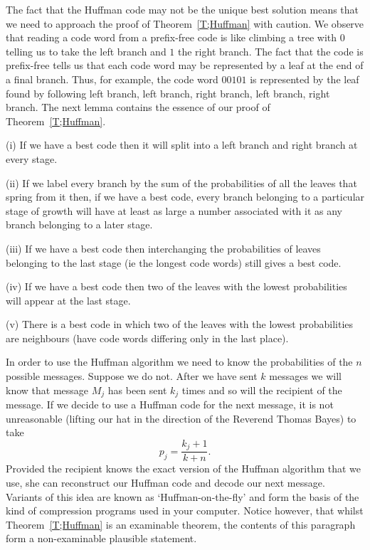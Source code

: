 The fact that the Huffman code may not be the unique
best solution means that we need to approach the proof of 
Theorem~\ref{T;Huffman} with caution. We observe that
reading a code word from a prefix-free
code is like climbing a tree
with $0$ telling us to take the left branch and 
$1$ the right branch. The fact that the code is prefix-free
tells us that each code word
may be represented by a leaf at the end of
a final branch. 
Thus, for example,
the code word $00101$ is represented by
the leaf found by following left branch, left branch,
right branch, left branch, right branch.
The next lemma contains the essence of our proof
of Theorem~\ref{T;Huffman}.
\begin{lemma}\label{L;pre Huffman}
(i) If we have a best code then it will split into
a left branch and right branch at every stage.

(ii) If we label every branch by the sum of the probabilities 
of all the leaves that spring from it then, if we have a best code, 
every branch belonging to a particular stage of growth will have at
least as large a number associated with it
as any branch belonging to a later stage.

(iii) If we have a best code then interchanging the 
probabilities of leaves belonging to the last stage
(ie the longest code words) still gives a best code.

(iv)  If we have a best code then two of the
leaves with the lowest probabilities will appear at the last stage.

(v) There is a best code in which two of the
leaves with the lowest probabilities are neighbours
(have code words differing only in the last place).
\end{lemma}

In order to use the Huffman algorithm we need to 
know the probabilities of the $n$ possible messages.
Suppose we do not. After we have sent $k$ messages
we will know that message $M_{j}$ has been sent
$k_{j}$ times and so will the recipient of the message.
If we decide to use a Huffman code for the next message,
it is not unreasonable (lifting our hat
in the direction of the Reverend Thomas Bayes) to take
\[p_{j}=\frac{k_{j}+1}{k+n}.\]
Provided the recipient knows the exact version of
the Huffman algorithm that we use, she can
reconstruct our Huffman code and decode our next message.
Variants of this idea are  known as `Huffman-on-the-fly'  
and form the basis of the kind of compression programs
used in your computer. Notice however, that whilst
Theorem~\ref{T;Huffman} is an examinable theorem, 
the contents of this paragraph form a non-examinable 
plausible statement.
